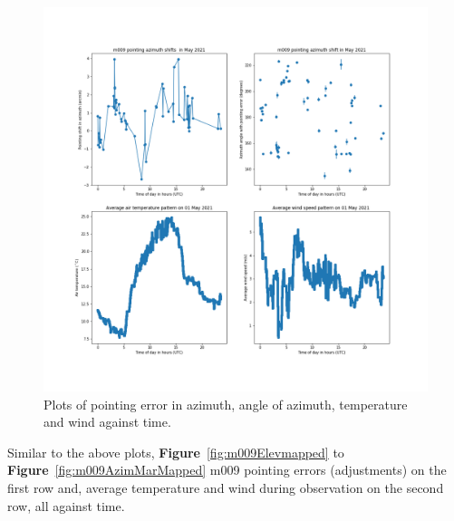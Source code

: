 \documentclass{article}
\begin{document}
\begin{figure}[H]
	\centering
	\includegraphics[scale=0.45]{m009_azim_May.png}
	
	\caption{Plots of pointing error in azimuth, angle of azimuth, temperature and wind against time.}
	\label{fig:m009AzimMay}
\end{figure}
Similar to the above plots, \textbf{Figure}~\ref{fig:m009Elevmapped} to \textbf{Figure}~\ref{fig:m009AzimMarMapped}  m009 pointing errors (adjustments) on the first row and, average temperature and wind during observation on the second row, all against time.      
\end{document}
